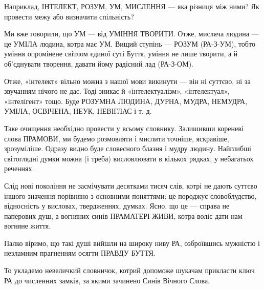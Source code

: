 Наприклад, ІНТЕЛЕКТ, РОЗУМ, УМ, МИСЛЕННЯ — яка різниця між ними? Як провести
межу або визначити спільність?

Ми вже говорили, що УМ — від УМІННЯ ТВОРИТИ. Отже, мисляча людина — це УМІЛА
людина, котра має УМ. Вищий ступінь — РОЗУМ (РА-З-УМ), тобто уміння опромінене
світлом єдиної суті Буття, уміння не лише творити, а й об’єднувати творення,
давати йому радісний лад (РА-З-ОМ).

Отже, «інтелект» вільно можна з нашої мови викинути — він ні суттєво, ні за
звучанням нічого не дає. Тоді зникає й «інтелектуалізм», «інтелектуал»,
«інтелігент» тощо. Буде РОЗУМНА ЛЮДИНА, ДУРНА, МУДРА, НЕМУДРА, УМІЛА, ОСВІЧЕНА,
НЕУК, НЕВІГЛАС і т. д.

Таке очищення необхідно провести у всьому словнику. Залишивши кореневі слова
ПРАМОВИ, ми будемо розмовляти і мислити точніше, яскравіше, зрозуміліше. Одразу
видно буде словесного блазня і мудру людину. Найглибші світоглядні думки можна
(і треба) висловлювати в кількох рядках, у небагатьох реченнях.

Слід нові покоління не засмічувати десятками тисяч слів, котрі не дають суттєво
іншого значення порівняно з основними поняттями: це породжує словоблудство,
відносність у висловах, твердженнях, думках. Ясно, що це — справа не паперових
душ, а вогняних синів ПРАМАТЕРІ ЖИВИ, котра воліє дати нам вогняне життя.

Палко віримо, що такі душі вийшли на широку ниву РА, озброївшись мужністю і
незламним прагненням осягти ПРАВДУ БУТТЯ.

То укладемо невеличкий словничок, котрий допоможе шукачам прикласти ключ РА до
численних замків, за якими зачинено Синів Вічного Слова.
